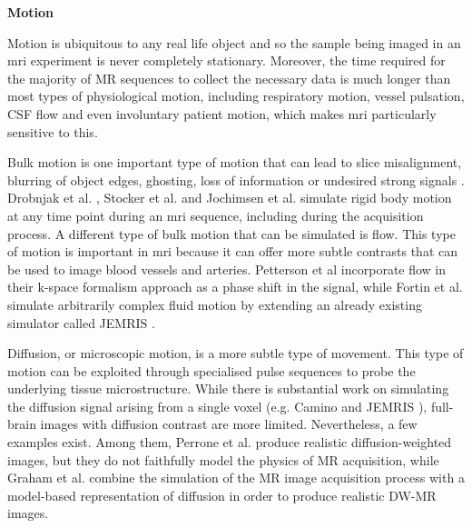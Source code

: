 

\hfill

\large \textbf{Motion} \normalsize

Motion is ubiquitous to any real life object and so the sample being imaged in an \ac{mri} experiment is never completely stationary.
Moreover, the time required for the majority of MR sequences to collect the necessary data is much longer than most types of physiological motion, including respiratory motion, vessel pulsation, CSF flow and even involuntary patient motion, which makes \ac{mri} particularly sensitive to this.

\hfill

Bulk motion is one important type of motion that can lead to slice misalignment, blurring of object edges, ghosting, loss of information or undesired strong signals \cite{Zaitsev2015}.
Drobnjak et al. \cite{Drobnjak2006}, Stocker et al. \cite{Stocker2010} and Jochimsen et al. \cite{Jochimsen2004} simulate rigid body motion at any time point during an \ac{mri} sequence, including during the acquisition process.
A different type of bulk motion that can be simulated is flow.
This type of motion is important in \ac{mri} because it can offer more subtle contrasts that can be used to image blood vessels and arteries.
Petterson et al \cite{Petersson1993} incorporate flow in their k-space formalism approach as a phase shift in the signal, while 
Fortin et al. \cite{Fortin2016} simulate arbitrarily complex fluid motion by extending an already existing simulator called JEMRIS \cite{Stocker2010}.

\hfill

Diffusion, or microscopic motion, is a more subtle type of movement.
This type of motion can be exploited through specialised pulse sequences to probe the underlying tissue microstructure.
While there is substantial work on simulating the diffusion signal arising from a single voxel (e.g. Camino \cite{Cook2006} and JEMRIS \cite{Stocker2010}),
full-brain images with diffusion contrast are more limited.
Nevertheless, a few examples exist.
Among them, Perrone et al. \cite{Perrone2016} produce realistic diffusion-weighted images, but they do not faithfully model the physics of MR acquisition,
while Graham et al. \cite{Graham2016} combine the simulation of the MR image acquisition process with a model-based representation of diffusion in order to produce realistic DW-MR images.

